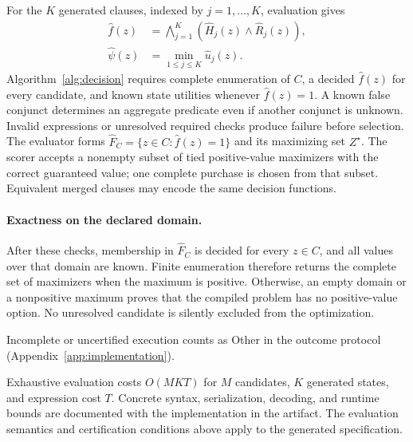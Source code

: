 \documentclass[11pt]{article}
\begin{document}
For the $K$ generated clauses, indexed by $j=1,\ldots,K$, evaluation gives
\begin{align}
\widehat f(z)&=\bigwedge_{j=1}^{K}(\widehat H_j(z)\wedge\widehat R_j(z)),\\
\widehat\psi(z)&=\min_{1\le j\le K}\widehat u_j(z).
\end{align}
Algorithm~\ref{alg:decision} requires complete enumeration of $C$, a decided $\widehat f(z)$ for every candidate, and known state utilities whenever $\widehat f(z)=1$. A known false conjunct determines an aggregate predicate even if another conjunct is unknown. Invalid expressions or unresolved required checks produce failure before selection. The evaluator forms $\widehat F_C=\{z\in C:\widehat f(z)=1\}$ and its maximizing set $Z^\star$. The scorer accepts a nonempty subset of tied positive-value maximizers with the correct guaranteed value; one complete purchase is chosen from that subset. Equivalent merged clauses may encode the same decision functions.

\paragraph{Exactness on the declared domain.}
After these checks, membership in $\widehat F_C$ is decided for every $z\in C$, and all values over that domain are known. Finite enumeration therefore returns the complete set of maximizers when the maximum is positive. Otherwise, an empty domain or a nonpositive maximum proves that the compiled problem has no positive-value option. No unresolved candidate is silently excluded from the optimization.

Incomplete or uncertified execution counts as Other in the outcome protocol (Appendix~\ref{app:implementation}).

Exhaustive evaluation costs $O(MKT)$ for $M$ candidates, $K$ generated states, and expression cost $T$. Concrete syntax, serialization, decoding, and runtime bounds are documented with the implementation in the artifact. The evaluation semantics and certification conditions above apply to the generated specification.
\end{document}
